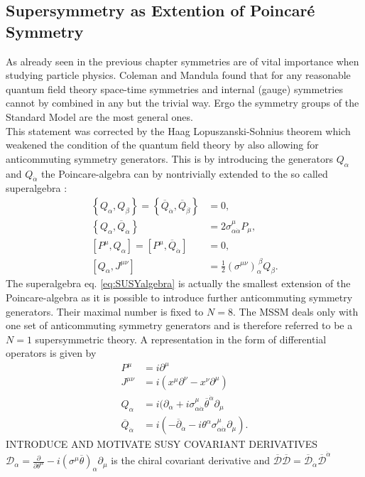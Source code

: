 \subsection{Supersymmetry as Extention of Poincaré Symmetry}\label{sec:SUSYalgebra}
As already seen in the previous chapter symmetries are of vital importance when studying particle physics. Coleman and Mandula \cite{Coleman:1967ad} found that for any reasonable quantum field theory space-time symmetries and internal (gauge) symmetries cannot by combined in any but the trivial way. Ergo the symmetry groups of the Standard Model are the most general ones.\\
This statement was corrected by the Haag Lopuszanski-Sohnius theorem \cite{Haag:1974qh} which weakened the condition of the quantum field theory by also allowing for anticommuting symmetry generators. This is by introducing the generators $Q_\alpha$ and $Q_{\dot{\alpha}}$ the Poincare-algebra can by nontrivially extended to the so called superalgebra :
\begin{align}
\left\{Q_\alpha,Q_\beta\right\} = \left\{\overline{Q}_{\dot{\alpha}},\overline{Q}_{\dot{\beta}}\right\} &= 0,  \nonumber\\
\left\{Q_\alpha,\overline{Q}_{\dot{\alpha}}\right\} &= 2\sigma^\mu_{\alpha\dot{\alpha}} P_\mu, \nonumber\\
[P^\mu,Q_\alpha] = [P^\mu,\overline{Q}_{\dot{\alpha}}] &= 0, \nonumber \\
[Q_\alpha, J^{\mu\nu}] &= \frac{1}{2} (\sigma^{\mu\nu})_\alpha^{\ \beta} Q_\beta.\label{eq:SUSYalgebra}
\end{align}
The superalgebra eq. \ref{eq:SUSYalgebra} is actually the smallest extension of the Poincare-algebra as it is possible to introduce further anticommuting symmetry generators. Their maximal number is fixed to $N = 8$. The MSSM deals only with one set of anticommuting symmetry generators and is therefore referred to be a $N = 1$ supersymmetric theory.
A representation in the form of differential operators is given by
\begin{align}
P^\mu &= i\partial^\mu\nonumber\\
J^{\mu\nu} &= i(x^\mu\partial^\nu - x^\nu\partial^\mu)\nonumber\\
Q_\alpha &= i(\partial_\alpha + i\sigma^\mu_{\alpha\dot{\alpha}}\overline{\theta}^{\dot{\alpha}}\partial_\mu\nonumber\\
\overline{Q}_{\dot{\alpha}} &= i(-\overline{\partial}_{\dot{\alpha}} - i \theta^\alpha \sigma^\mu_{\alpha\dot{\alpha}}\partial_\mu).
\end{align}
INTRODUCE AND MOTIVATE SUSY COVARIANT DERIVATIVES $\mathcal{D}_\alpha = \frac{\partial}{\partial \theta^\alpha} - i(\sigma^\mu\overline{\theta})_\alpha\partial_\mu$ is the chiral covariant derivative and $\overline{\mathcal{D}}\overline{\mathcal{D}} = \overline{\mathcal{D}}_{\dot{\alpha}}\overline{\mathcal{D}}^{\dot{\alpha}}$


